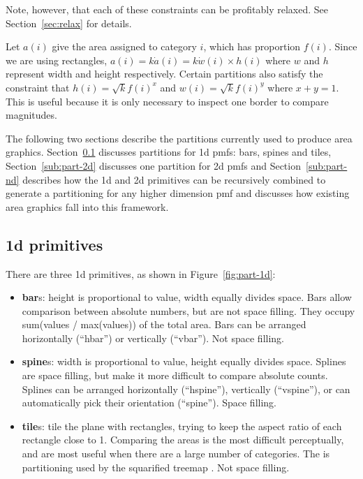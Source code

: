\documentclass[letterpaper,oneside]{scrartcl}
\begin{document}
Note, however, that each of these constraints can be profitably relaxed. See Section~\ref{sec:relax} for details.

Let $a(i)$ give the area assigned to category $i$, which has proportion $f(i)$. Since we are using rectangles, $a(i) = k \dot a(i) = k \dot w(i) \times h(i)$ where $w$ and $h$ represent width and height respectively. Certain partitions also satisfy the constraint that $h(i) = \sqrt{k} f(i)^x$ and $w(i) = \sqrt{k} f(i)^y$ where $x + y = 1$. This is useful because it is only necessary to inspect one border to compare magnitudes.

The following two sections describe the partitions currently used to produce area graphics. Section~\ref{sub:part-1d} discusses partitions for 1d pmfs: bars, spines and tiles, Section~\ref{sub:part-2d} discusses one partition for 2d pmfs and Section~\ref{sub:part-nd} describes how the 1d and 2d primitives can be recursively combined to generate a partitioning for any higher dimension pmf and discusses how existing area graphics fall into this framework.

\subsection{1d primitives}
\label{sub:part-1d}

There are three 1d primitives, as shown in Figure~\ref{fig:part-1d}:

\begin{itemize}

  \item {\bf bar}s: height is proportional to value, width equally divides space. Bars allow comparison between absolute numbers, but are not space filling.  They occupy sum(values / max(values)) of the total area.  Bars can be arranged horizontally (``hbar'') or vertically (``vbar'').  Not space filling.

  \item {\bf spine}s: width is proportional to value, height equally divides space. Splines are space filling, but make it more difficult to compare absolute counts.  Splines can be arranged horizontally (``hspine''),  vertically (``vspine''), or can automatically pick their orientation (``spine'').  Space filling.

  \item {\bf tile}s: tile the plane with rectangles, trying to keep the aspect ratio of each rectangle close to 1. Comparing the areas is the most difficult perceptually, and are most useful when there are a large number of categories.  The is partitioning used by the squarified treemap \citep{bruls:1999}.  Not space filling.

\end{itemize}
\end{document}
